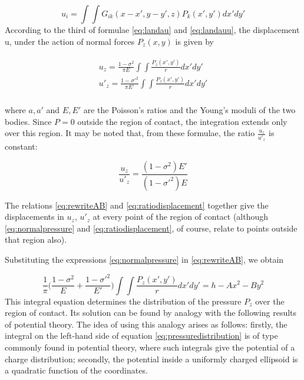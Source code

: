\begin{equation}
u_{i} = \int\int G_{ik} (x - x', y-y', z) P_{k}(x',y') dx' dy'
\label{eq:landauu}
\end{equation}
According to the third of formulae \ref{eq:landau} and \ref{eq:landauu}, the
displacement u, under the action of normal forces $P_{z}(x, y)$ is given by

\begin{align}
\begin{split}
u_{z} = \frac{1-\sigma^{2}}{\pi E}\int\int\frac{P_{z}(x',y')}{r}dx'dy' \\
u'_{z} = \frac{1-\sigma'^{2}}{\pi E'}\int\int\frac{P_{z}(x',y')}{r}dx'dy' \\
\end{split}
\label{eq:normalpressure}
\end{align}

where $a, a'$ and $E, E'$ are the Poisson’s ratios and the Young’s moduli of the two bodies. Since $P = 0$ outside the region of contact, the integration extends only over this region. It may be noted that, from these formulae, the ratio $\frac{u_{z}}{u'_{z}}$ is constant:

\begin{equation}
\frac{u_{z}}{u'_{z}} = \frac{(1-\sigma^{2})E'}{(1-\sigma'^{2})E}
\label{eq:ratiodisplacement}
\end{equation}

The relations \ref{eq:rewriteAB} and \ref{eq:ratiodisplacement} together give the displacements in $u_{z}$, $u'_{z}$ at every point of the region of contact (although \ref{eq:normalpressure} and \ref{eq:ratiodisplacement}, of course, relate to
points outside that region also).

Substituting the expressions \ref{eq:normalpressure} in \ref{eq:rewriteAB}, we obtain

\begin{equation}
\frac{1}{\pi}\Big(\frac{1-\sigma^{2}}{E}+\frac{1-\sigma'^{2}}{E'}\Big)\int\int\frac{P_{z}(x',y')}{r}dx'dy' = h-Ax^{2}-By^{2}
\label{eq:pressuredistribution}
\end{equation}
This integral equation determines the distribution of the pressure $P_{z}$ over the region of contact. Its solution can be found by analogy with the following results of potential theory. The idea of using this analogy arises as follows:
firstly, the integral on the left-hand side of equation \ref{eq:pressuredistribution} is of type commonly found in potential theory, where such integrals give the potential of a
charge distribution; secondly, the potential inside a uniformly charged ellipsoid is a quadratic function of the coordinates.

